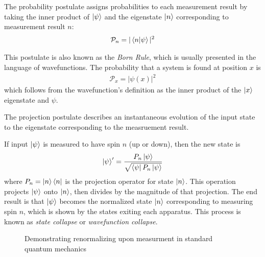 The probability postulate assigns probabilities to each measurement result by taking the inner product of $\ket{\psi}$ and the eigenstate $\ket{n}$ corresponding to measurement result $n$:
\begin{align}
    \mathcal{P}_n = |\braket{n|\psi}|^2
\end{align}

This postulate is also known as the \textit{Born Rule}, which is usually presented in the language of wavefunctions. The probability that a system is found at position $x$ is
\begin{align}
    \mathcal{P}_x = |\psi(x)|^2
\end{align}
which follows from the wavefunction's definition as the inner product of the $\ket{x}$ eigenstate and $\psi$.

The projection postulate describes an instantaneous evolution of the input state to the eigenstate corresponding to the measruement result.

If input $\ket{\psi}$ is measured to have spin $n$ (up or down), then the new state is
\begin{align}
    \ket{\psi}^\prime = \frac{P_n\ket{\psi}}{\sqrt{\bra{\psi}P_n\ket{\psi}
    }}
\end{align}
where $P_n = \ket{n}\bra{n}$ is the projection operator for state $\ket{n}$. This operation projects $\ket{\psi}$ onto $\ket{n}$, then divides by the magnitude of that projection. The end result is that $\ket{\psi}$ becomes the normalized state $\ket{n}$ corresponding to measuring spin $n$, which is shown by the states exiting each apparatus. This process is known as \textit{state collapse} or \textit{wavefunction collapse}.

\begin{figure}
\centering\CaptionFontSize
{}
\caption[Insert an abbreviated caption here to show in the List of Figures]
{Demonstrating renormalizing upon measurment in standard quantum mechanics}
\label{Figure:Intro:FigureExampleA}
\end{figure}

